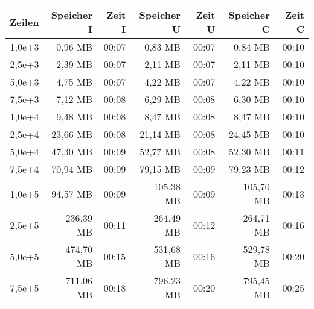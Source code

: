 \begin{table}
    \centering
    \begin{tabular}{|r|r|r|r|r|r|r|}
        \hline
        \textbf{Zeilen} & \textbf{Speicher I} & \textbf{Zeit I} & \textbf{Speicher U} & \textbf{Zeit U} & \textbf{Speicher C} & \textbf{Zeit C} \\ \hline
        1,0e+3          & 0,96 MB             & 00:07           & 0,83 MB             & 00:07           & 0,84 MB             & 00:10           \\ \hline
        2,5e+3          & 2,39 MB             & 00:07           & 2,11 MB             & 00:07           & 2,11 MB             & 00:10           \\ \hline
        5,0e+3          & 4,75 MB             & 00:07           & 4,22 MB             & 00:07           & 4,22 MB             & 00:10           \\ \hline
        7,5e+3          & 7,12 MB             & 00:08           & 6,29 MB             & 00:08           & 6,30 MB             & 00:10           \\ \hline
        1,0e+4          & 9,48 MB             & 00:08           & 8,47 MB             & 00:08           & 8,47 MB             & 00:10           \\ \hline
        2,5e+4          & 23,66 MB            & 00:08           & 21,14 MB            & 00:08           & 24,45 MB            & 00:10           \\ \hline
        5,0e+4          & 47,30 MB            & 00:09           & 52,77 MB            & 00:08           & 52,30 MB            & 00:11           \\ \hline
        7,5e+4          & 70,94 MB            & 00:09           & 79,15 MB            & 00:09           & 79,23 MB            & 00:12           \\ \hline
        1,0e+5          & 94,57 MB            & 00:09           & 105,38 MB           & 00:09           & 105,70 MB           & 00:13           \\ \hline
        2,5e+5          & 236,39 MB           & 00:11           & 264,49 MB           & 00:12           & 264,71 MB           & 00:16           \\ \hline
        5,0e+5          & 474,70 MB           & 00:15           & 531,68 MB           & 00:16           & 529,78 MB           & 00:20           \\ \hline
        7,5e+5          & 711,06 MB           & 00:18           & 796,23 MB           & 00:20           & 795,45 MB           & 00:25           \\ \hline

\end{tabular}
\end{table}
